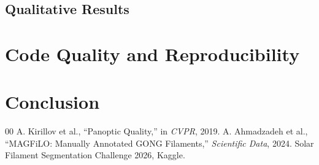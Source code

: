 \documentclass[conference]{IEEEtran}
\begin{document}
\subsection{Qualitative Results}

\section{Code Quality and Reproducibility}

\section{Conclusion}

\begin{thebibliography}{00}
 A. Kirillov et al., ``Panoptic Quality,'' in \textit{CVPR}, 2019.
 A. Ahmadzadeh et al., ``MAGFiLO: Manually Annotated GONG Filaments,'' \textit{Scientific Data}, 2024.
 Solar Filament Segmentation Challenge 2026, Kaggle.
\end{thebibliography}
\end{document}

